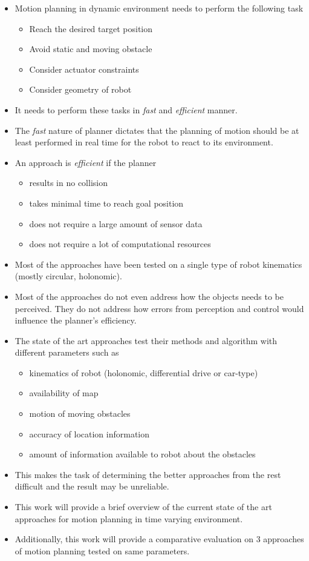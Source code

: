 \begin{itemize}
\item Motion planning in dynamic environment needs to perform the following task
\begin{itemize}
    \item Reach the desired target position
    \item Avoid static and moving obstacle
    \item Consider actuator constraints
    \item Consider geometry of robot
\end{itemize}
\item It needs to perform these tasks in \textit{fast} and \textit{efficient} manner. 
\item The \textit{fast} nature of planner dictates that the planning of motion should be at least performed in real time for the robot to react to its environment. 
\item An approach is \textit{efficient} if the planner
\begin{itemize}
    \item results in no collision
    \item takes minimal time to reach goal position
    \item does not require a large amount of sensor data
    \item does not require a lot of computational resources
\end{itemize}

\item Most of the approaches have been tested on a single type of robot kinematics (mostly circular, holonomic).
\item Most of the approaches do not even address how the objects needs to be perceived. They do not address how errors from perception and control would influence the planner's efficiency.
\item The state of the art approaches test their methods and algorithm with different parameters such as
    \begin{itemize}
        \item kinematics of robot (holonomic, differential drive or car-type)
        \item availability of map
        \item motion of moving obstacles
        \item accuracy of location information
        \item amount of information available to robot about the obstacles
    \end{itemize}
\item This makes the task of determining the better approaches from the rest difficult and the result may be unreliable.
\item This work will provide a brief overview of the current state of the art approaches for motion planning in time varying environment.
\item Additionally, this work will provide a comparative evaluation on 3 approaches of motion planning tested on same parameters.
\end{itemize}

